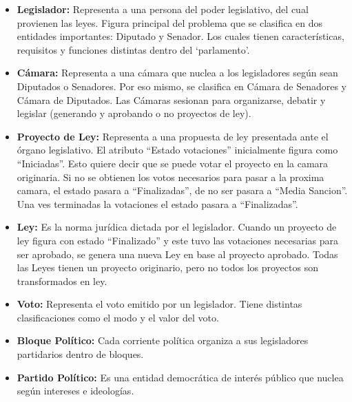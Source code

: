 \begin{itemize}
\item \textbf{Legislador: } Representa a una persona del poder legislativo, del cual provienen las leyes. Figura principal del problema que se clasifica en dos entidades importantes: Diputado y Senador. Los cuales tienen caracter\'isticas, requisitos y funciones distintas dentro del \lq parlamento\rq . 

\quad 

\item \textbf{C\'amara: } Representa a una c\'amara que nuclea a los legisladores seg\'un sean Diputados o Senadores. Por eso mismo, se clasifica en C\'amara de Senadores y C\'amara de Diputados. Las C\'amaras sesionan para organizarse, debatir y legislar (generando y aprobando o no proyectos de ley).

\quad

\item \textbf{Proyecto de Ley: } Representa a una propuesta de ley presentada ante el \'organo legislativo. El atributo ``Estado votaciones'' inicialmente figura como ``Iniciadas''. Esto quiere decir que se puede votar el proyecto en la camara originaria. Si no se obtienen los votos necesarios para pasar a la proxima camara, el estado pasara a ``Finalizadas'', de no ser pasara a ``Media Sancion''. Una ves terminadas la votaciones el estado pasara a ``Finalizadas''.

\quad

\item \textbf{Ley: } Es la norma jur\'idica dictada por el legislador. Cuando un proyecto de ley figura con estado ``Finalizado'' y este tuvo las votaciones necesarias para ser aprobado, se genera una nueva Ley en base al proyecto aprobado. Todas las Leyes tienen un proyecto originario, pero no todos los proyectos son transformados en ley.

\quad

\item \textbf{Voto: } Representa el voto emitido por un legislador. Tiene distintas clasificaciones como el modo y el valor del voto.

\quad

\item \textbf{Bloque Pol\'itico: } Cada corriente pol\'itica organiza a sus legisladores partidarios dentro de bloques.

\quad

\item \textbf{Partido Pol\'itico: } Es una entidad democr\'atica de inter\'es p\'ublico que nuclea seg\'un intereses e ideolog\'ias. 


\end{itemize}
